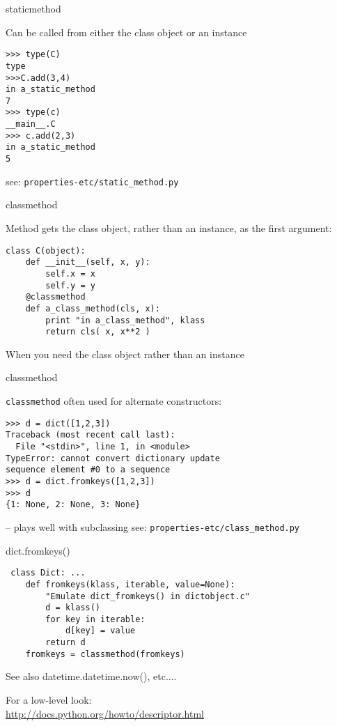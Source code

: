 \documentclass{beamer}
\begin{document}
\begin{frame}[fragile]{staticmethod}

{ \Large Can be called from either the class object or an instance }

\begin{verbatim}
>>> type(C)
type
>>>C.add(3,4)
in a_static_method
7
>>> type(c)
__main__.C
>>> c.add(2,3)
in a_static_method
5
\end{verbatim}



\vfill
see: \verb|properties-etc/static_method.py|
\end{frame} 


\begin{frame}[fragile]{classmethod}

{ \Large Method gets the class object, rather than an instance, as the first argument:}

\begin{verbatim}
class C(object):
    def __init__(self, x, y):
        self.x = x
        self.y = y
    @classmethod
    def a_class_method(cls, x):
        print "in a_class_method", klass
        return cls( x, x**2 )
\end{verbatim}
{\Large When you need the class object rather than an instance}

\end{frame} 

\begin{frame}[fragile]{classmethod}

{ \Large \verb|classmethod| often used for alternate constructors:}

\begin{verbatim}
>>> d = dict([1,2,3])
Traceback (most recent call last):
  File "<stdin>", line 1, in <module>
TypeError: cannot convert dictionary update
sequence element #0 to a sequence
>>> d = dict.fromkeys([1,2,3])
>>> d
{1: None, 2: None, 3: None}
\end{verbatim}

{\Large -- plays well with subclassing}
\vfill
see: \verb|properties-etc/class_method.py|
\end{frame} 

\begin{frame}[fragile]{dict.fromkeys()}

\begin{verbatim}
￼class Dict: ...
    def fromkeys(klass, iterable, value=None):
        "Emulate dict_fromkeys() in dictobject.c"
        d = klass()
        for key in iterable:
            d[key] = value
        return d
    fromkeys = classmethod(fromkeys)
\end{verbatim}

\vfill
{\Large See also datetime.datetime.now(), etc....}

\vfill
For a low-level look:\\
\url{http://docs.python.org/howto/descriptor.html}

\end{frame} 
\end{document}
